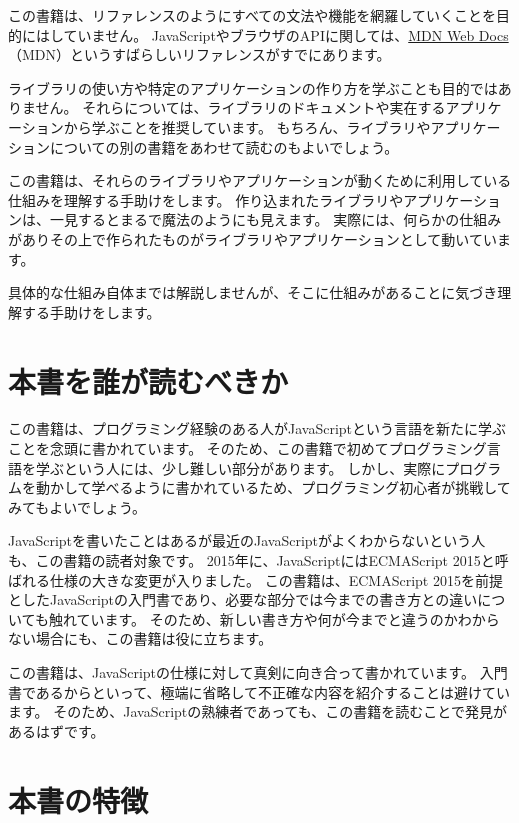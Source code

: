 この書籍は、リファレンスのようにすべての文法や機能を網羅していくことを目的にはしていません。
JavaScriptやブラウザのAPIに関しては、\href{https://developer.mozilla.org/ja/}{MDN
Web Docs}（MDN）というすばらしいリファレンスがすでにあります。

ライブラリの使い方や特定のアプリケーションの作り方を学ぶことも目的ではありません。
それらについては、ライブラリのドキュメントや実在するアプリケーションから学ぶことを推奨しています。
もちろん、ライブラリやアプリケーションについての別の書籍をあわせて読むのもよいでしょう。

この書籍は、それらのライブラリやアプリケーションが動くために利用している仕組みを理解する手助けをします。
作り込まれたライブラリやアプリケーションは、一見するとまるで魔法のようにも見えます。
実際には、何らかの仕組みがありその上で作られたものがライブラリやアプリケーションとして動いています。

具体的な仕組み自体までは解説しませんが、そこに仕組みがあることに気づき理解する手助けをします。

\hypertarget{who-read}{%
\section*{本書を誰が読むべきか}\label{who-read}}

この書籍は、プログラミング経験のある人がJavaScriptという言語を新たに学ぶことを念頭に書かれています。
そのため、この書籍で初めてプログラミング言語を学ぶという人には、少し難しい部分があります。
しかし、実際にプログラムを動かして学べるように書かれているため、プログラミング初心者が挑戦してみてもよいでしょう。

JavaScriptを書いたことはあるが最近のJavaScriptがよくわからないという人も、この書籍の読者対象です。
2015年に、JavaScriptにはECMAScript
2015と呼ばれる仕様の大きな変更が入りました。 この書籍は、ECMAScript
2015を前提としたJavaScriptの入門書であり、必要な部分では今までの書き方との違いについても触れています。
そのため、新しい書き方や何が今までと違うのかわからない場合にも、この書籍は役に立ちます。

この書籍は、JavaScriptの仕様に対して真剣に向き合って書かれています。
入門書であるからといって、極端に省略して不正確な内容を紹介することは避けています。
そのため、JavaScriptの熟練者であっても、この書籍を読むことで発見があるはずです。

\hypertarget{features}{%
\section*{本書の特徴}\label{features}}

